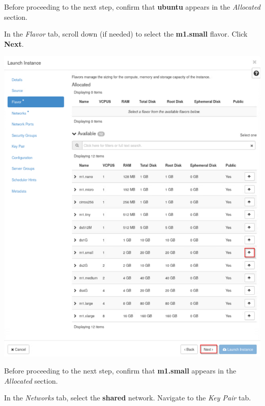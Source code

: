 \documentclass[letterpaper, 12pt]{article}
\begin{document}
\begin{enumerate}
    \begin{stopbox}
        Before proceeding to the next step, confirm that \textbf{ubuntu} appears in the \textit{Allocated} section.
    \end{stopbox}

    \begin{labstep}
        In the \textit{Flavor} tab, scroll down (if needed) to select the \textbf{m1.small} flavor.
        Click \textbf{Next}.

        \begin{center}
            \includegraphics[width=\linewidth]{images/part4/step9.png}
        \end{center}
    \end{labstep}

    \begin{stopbox}
        Before proceeding to the next step, confirm that \textbf{m1.small} appears in the \textit{Allocated} section.
    \end{stopbox}

    \begin{labstep}
        In the \textit{Networks} tab, select the \textbf{shared} network.
        Navigate to the \textit{Key Pair} tab.


\end{labstep}
\end{enumerate}
\end{document}
